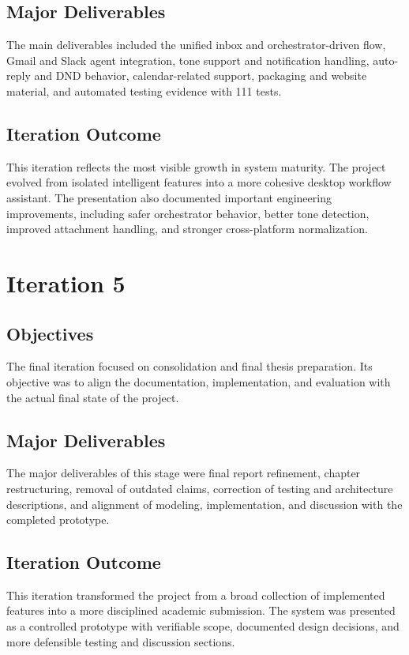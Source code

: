 \subsection{Major Deliverables}
The main deliverables included the unified inbox and orchestrator-driven flow, Gmail and Slack agent integration, tone support and notification handling, auto-reply and DND behavior, calendar-related support, packaging and website material, and automated testing evidence with 111 tests.

\subsection{Iteration Outcome}
This iteration reflects the most visible growth in system maturity. The project evolved from isolated intelligent features into a more cohesive desktop workflow assistant. The presentation also documented important engineering improvements, including safer orchestrator behavior, better tone detection, improved attachment handling, and stronger cross-platform normalization.

\section{Iteration 5}
\subsection{Objectives}
The final iteration focused on consolidation and final thesis preparation. Its objective was to align the documentation, implementation, and evaluation with the actual final state of the project.

\subsection{Major Deliverables}
The major deliverables of this stage were final report refinement, chapter restructuring, removal of outdated claims, correction of testing and architecture descriptions, and alignment of modeling, implementation, and discussion with the completed prototype.

\subsection{Iteration Outcome}
This iteration transformed the project from a broad collection of implemented features into a more disciplined academic submission. The system was presented as a controlled prototype with verifiable scope, documented design decisions, and more defensible testing and discussion sections.
